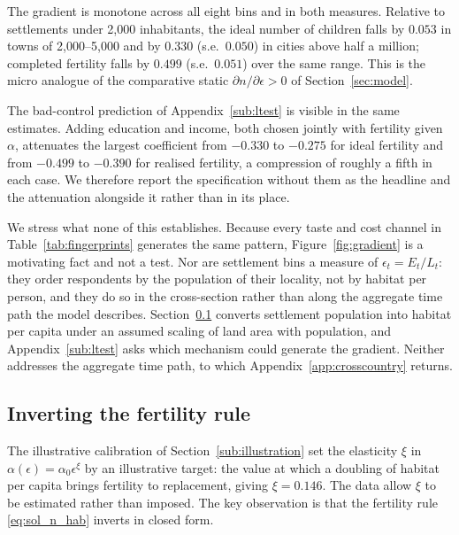 \documentclass[11pt]{article}
\begin{document}
The gradient is monotone across all eight bins and in both measures. Relative to settlements under
2{,}000 inhabitants, the ideal number of children falls by $0.053$ in towns of 2{,}000--5{,}000 and by
$0.330$ (s.e.\ $0.050$) in cities above half a million; completed fertility falls by $0.499$
(s.e.\ $0.051$) over the same range. This is the micro analogue of the comparative static
$\partial n/\partial \epsilon>0$ of Section~\ref{sec:model}.

The bad-control prediction of Appendix~\ref{sub:ltest} is visible in the same estimates. Adding
education and income, both chosen jointly with fertility given $\alpha$, attenuates the
largest coefficient from $-0.330$ to $-0.275$ for ideal fertility and from $-0.499$ to $-0.390$ for
realised fertility, a compression of roughly a fifth in each case. We therefore report the
specification without them as the headline and the attenuation alongside it rather than in its
place.

We stress what none of this establishes. Because every taste and cost channel in Table~\ref{tab:fingerprints} generates the same pattern,
Figure~\ref{fig:gradient} is a motivating fact and not a test. Nor are settlement bins a measure of
$\epsilon_t=E_t/L_t$: they order respondents by the population of their locality, not by habitat per
person, and they do so in the cross-section rather than along the aggregate time path the model
describes. Section~\ref{sub:xi} converts settlement population into habitat per capita under an
assumed scaling of land area with population, and Appendix~\ref{sub:ltest} asks which mechanism could
generate the gradient. Neither addresses the aggregate time path, to which
Appendix~\ref{app:crosscountry} returns.

\subsection{Inverting the fertility rule}
\label{sub:xi}

The illustrative calibration of Section~\ref{sub:illustration} set the elasticity $\xi$ in
$\alpha(\epsilon)=\alpha_0\epsilon^{\xi}$ by an illustrative target: the value at which a doubling of
habitat per capita brings fertility to replacement, giving $\xi=0.146$. The data allow $\xi$ to be
estimated rather than imposed. The key observation is that the fertility rule
\eqref{eq:sol_n_hab} inverts in closed form.
\end{document}
